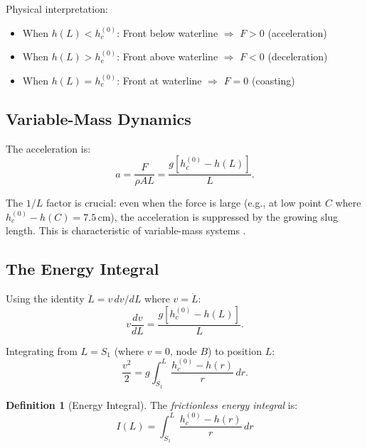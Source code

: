 \documentclass[11pt,a4paper]{article}
\theoremstyle{definition}
\newtheorem{definition}{Definition}
\begin{document}
Physical interpretation:
\begin{itemize}[nosep,leftmargin=2em]
  \item When $h(L) < h_c^{(0)}$: Front below waterline $\Rightarrow$ $F > 0$ (acceleration)
  \item When $h(L) > h_c^{(0)}$: Front above waterline $\Rightarrow$ $F < 0$ (deceleration)
  \item When $h(L) = h_c^{(0)}$: Front at waterline $\Rightarrow$ $F = 0$ (coasting)
\end{itemize}

\subsection{Variable-Mass Dynamics}

The acceleration is:
\begin{equation}
  a = \frac{F}{\rho A L} = \frac{g[h_c^{(0)} - h(L)]}{L}.
  \label{eq:acceleration}
\end{equation}

The $1/L$ factor is crucial: even when the force is large (e.g., at low point $C$ where $h_c^{(0)} - h(C) = 7.5$\,cm), the acceleration is suppressed by the growing slug length. This is characteristic of variable-mass systems \citep{plastino1992}.

\subsection{The Energy Integral}

Using the identity $\ddot{L} = v\,dv/dL$ where $v = \dot{L}$:
\begin{equation}
  v\frac{dv}{dL} = \frac{g[h_c^{(0)} - h(L)]}{L}.
  \label{eq:v-dv-dL}
\end{equation}

Integrating from $L = S_1$ (where $v = 0$, node $B$) to position $L$:
\begin{equation}
  \frac{v^2}{2} = g\int_{S_1}^{L} \frac{h_c^{(0)} - h(r)}{r}\,dr.
  \label{eq:energy-int-derivation}
\end{equation}

\begin{definition}[Energy Integral]
The \emph{frictionless energy integral} is:
\begin{equation}
  \boxed{I(L) = \int_{S_1}^{L} \frac{h_c^{(0)} - h(r)}{r}\,dr}
  \label{eq:I-def}
\end{equation}
\end{definition}
\end{document}
